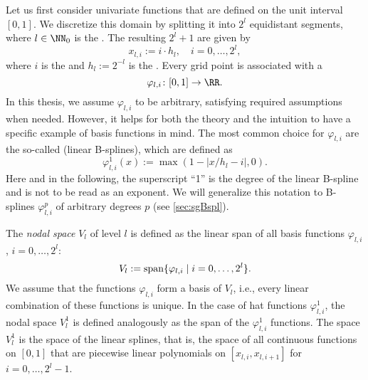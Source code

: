 Let us first consider univariate functions
that are defined on the unit interval $[0, 1]$.
%
We discretize this domain by splitting it into $2^l$ equidistant segments,
where $l \in \NN_0$ is the .
%
%
%
The resulting $2^l + 1$  are given by
\begin{equation}
  x_{l,i} := i \cdot h_l,\quad
  i = 0, \dotsc, 2^l,
\end{equation}
where $i$ is the  and $h_l := 2^{-l}$ is the .
%
Every grid point is associated with a 
\begin{equation}
  \varphi_{l,i}\colon [0, 1] \to \RR.
\end{equation}
In this thesis, we assume $\varphi_{l,i}$ to be arbitrary,
satisfying required assumptions when needed.
However, it helps for both the theory and the intuition to have a
specific example of basis functions in mind.
%
The most common choice for $\varphi_{l,i}$ are the so-called 
(linear B-splines), which are defined as
\begin{equation}
  \varphi_{l,i}^1(x)
  := \max(1 - |x/h_l - i|, 0).
\end{equation}
Here and in the following,
the superscript ``1'' is the degree of the linear B-spline and
is not to be read as an exponent.
We will generalize this notation to B-splines $\varphi_{l,i}^p$ of
arbitrary degrees $p$ (see \cref{sec:sgBspl}).

%
The \emph{nodal space} $V_l$ of level $l$
is defined as the linear span of all basis functions
$\varphi_{l,i}$, $i = 0, \dotsc, 2^l$:
\begin{equation}
  V_l := \operatorname{span}\{\varphi_{l,i} \mid i = 0, \dotsc, 2^l\}.
\end{equation}
We assume that the functions $\varphi_{l,i}$ form a basis of $V_l$, i.e.,
every linear combination of these functions is unique.
%
In the case of hat functions $\varphi_{l,i}^1$,
the nodal space $V_l^1$ is defined analogously as the span of the
$\varphi_{l,i}^1$ functions.
The space $V_l^1$ is the space of the linear splines,
that is, the space of all continuous functions on $[0, 1]$ that are
piecewise linear polynomials on $[x_{l,i}, x_{l,i+1}]$ for
$i = 0, \dotsc, 2^l - 1$.

